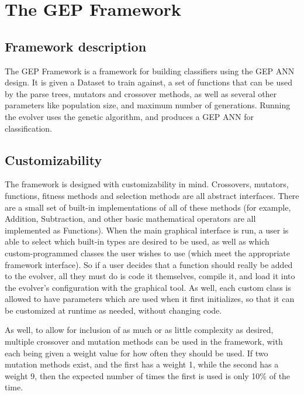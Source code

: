 \documentclass[a4paper,11pt]{report}
\begin{document}
\chapter{The GEP Framework}

\section{Framework description}
The GEP Framework is a framework for building classifiers using the GEP ANN design. It is given 
a Dataset to train against, a set of functions that can be used by the parse trees, mutators and crossover methods, 
as well as several other parameters like population size, and maximum number of generations. Running the 
evolver uses the genetic algorithm, and produces a GEP ANN for classification. 

\section{Customizability}
The framework is designed with customizability in mind. Crossovers, mutators, functions, fitness methods and selection 
methods are all abstract interfaces. There are a small set of built-in implementations of all of these methods (for 
example, Addition, Subtraction, and other basic mathematical operators are all implemented as Functions). When the 
main graphical interface is run, a user is able to select which built-in types are desired to be used, as well as 
which custom-programmed classes the user wishes to use (which meet the appropriate framework interface). So if 
a user decides that a function should really be added to the evolver, all they must do is code it themselves, compile
it, and load it into the evolver's configuration with the graphical tool. 
As well, each custom class is allowed to have parameters which are used when it first initializes, so that it can 
be customized at runtime as needed, without changing code.

As well, to allow for inclusion of as much or as little complexity as desired, multiple crossover and mutation methods 
can be used in the framework, with each being given a weight value for how often they should be used. If two mutation methods 
exist, and the first has a weight 1, while the second has a weight 9, then the expected number of times the first is used 
is only 10\% of the time. 

\end{document}
